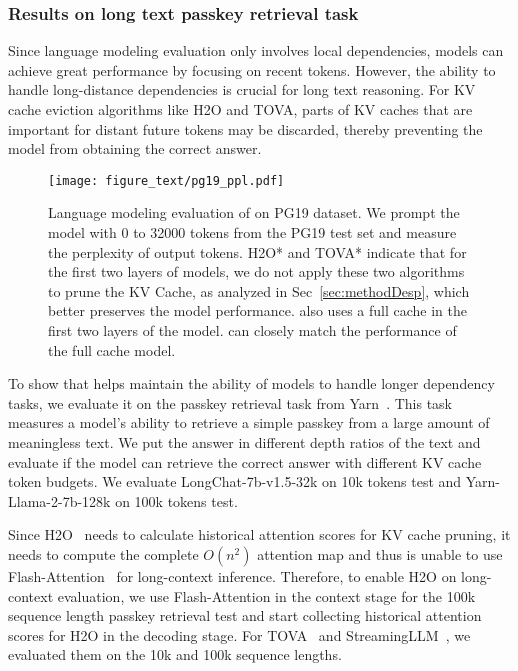 \subsubsection{Results on long text passkey retrieval task}
Since language modeling evaluation only involves local dependencies, models can achieve great performance by focusing on recent tokens. However, the ability to handle long-distance dependencies is crucial for long text reasoning. For KV cache eviction algorithms like H2O and TOVA, parts of KV caches that are important for distant future tokens may be discarded, thereby preventing the model from obtaining the correct answer.
\begin{figure}
    \centering
     \texttt{[image: figure\_text/pg19\_ppl.pdf]}
    \caption{Language modeling evaluation of \method on PG19 dataset. We prompt the model with 0 to 32000 tokens from the PG19 test set and measure the perplexity of output tokens. H2O* and TOVA* indicate that for the first two layers of models, we do not apply these two algorithms to prune the KV Cache, as analyzed in Sec~\ref{sec:methodDesp}, which better preserves the model performance. \method also uses a full cache in the first two layers of the model. \method can closely match the performance of the full cache model.}
    \label{fig:pg19ppl}

\end{figure}
To show that \method helps maintain the ability of models to handle longer dependency tasks, we evaluate it on the passkey retrieval task from Yarn~\cite{peng2023yarn}. This task measures a model's ability to retrieve a simple passkey from a large amount of meaningless text. We put the answer in different depth ratios of the text and evaluate if the model can retrieve the correct answer with different KV cache token budgets. We evaluate LongChat-7b-v1.5-32k on 10k tokens test and Yarn-Llama-2-7b-128k on 100k tokens test.

Since H2O~\cite{zhang2023h2o} needs to calculate historical attention scores for KV cache pruning, it needs to compute the complete $O(n^2)$ attention map and thus is unable to use Flash-Attention~\cite{dao2022flashattention} for long-context inference. Therefore, to enable H2O on long-context evaluation, we use Flash-Attention in the context stage for the 100k sequence length passkey retrieval test and start collecting historical attention scores for H2O in the decoding stage. For TOVA~\cite{oren2024transformers} and StreamingLLM~\cite{xiao2023streamingllm}, we evaluated them on the 10k and 100k sequence lengths.

